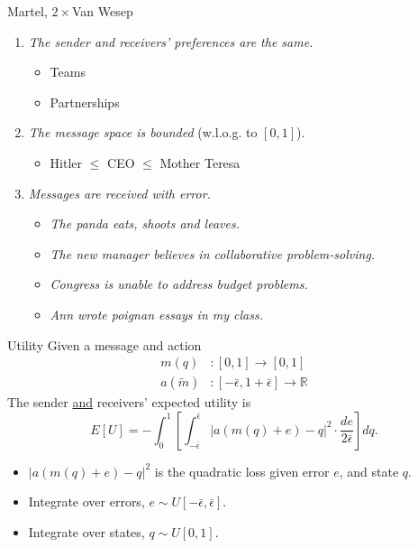 \documentclass[hyperref={colorlinks=true,linkcolor=blue,citecolor=blue}]{beamer}
\begin{document}
\begin{frame}{Martel, $2\times$Van Wesep}
\begin{enumerate}
\item \textit{The sender and receivers' preferences are the same.}
\begin{itemize}
\item Teams
\item Partnerships
\end{itemize}
\item \textit{The message space is bounded} (w.l.o.g. to $[0,1]$).
\begin{itemize}
\item Hitler $\leq$ CEO $\leq$ Mother Teresa
\end{itemize}
\item \textit{Messages are received with error.} 
\begin{itemize}
\item\textit{The panda eats, shoots and leaves.}
\item\textit{The new manager believes in collaborative problem-solving.}
\item\textit{Congress is unable to address budget problems.}
\item\textit{Ann wrote poignan essays in my class.}
\end{itemize}
\end{enumerate}
\end{frame}

\begin{frame}{Utility}
Given a message and action
\begin{align}
m(q)&:[0,1]\rightarrow[0,1]\\
a(\widetilde{m})&:[-\bar{\epsilon},1+\bar{\epsilon}]\rightarrow\mathbb{R}
\end{align}
The sender \underline{and} receivers' expected utility is 
\begin{equation}
E[U]=-\int_{0}^{1}{\left[\int_{-\bar{\epsilon}}^{\bar{\epsilon}}{|a(m(q)+e)-q|^{2}\cdot\frac{de}{2\bar{\epsilon}}}\right]dq.}
\end{equation}
\begin{itemize}
\item $|a(m(q)+e)-q|^{2}$ is the quadratic loss given error $e$, and state $q$.
\item Integrate over errors, $e\sim U[-\bar{\epsilon},\bar{\epsilon}]$.
\item Integrate over states, $q\sim U[0,1]$. 
\end{itemize}
\end{frame}
\end{document}
